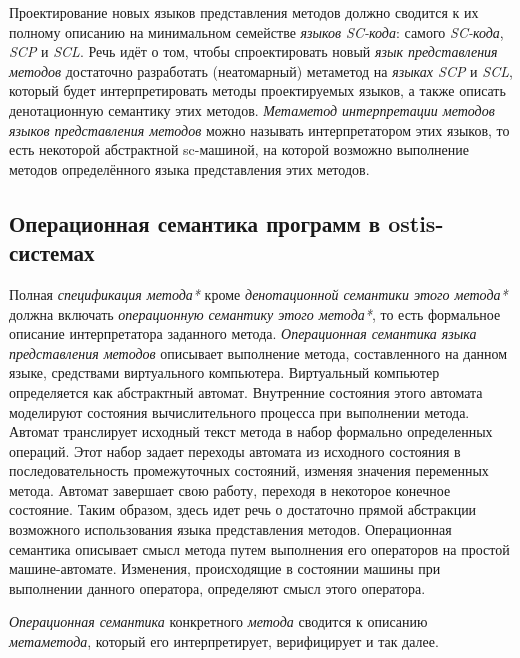 \begin{textitemize}
    \item Проектирование новых языков представления методов должно сводится к их полному описанию на минимальном семействе \textit{языков SC-кода}: самого \textit{SC-кода}, \textit{SCP} и \textit{SCL}. Речь идёт о том, чтобы спроектировать новый \textit{язык представления методов} достаточно разработать (неатомарный) метаметод на \textit{языках SCP} и \textit{SCL}, который будет интерпретировать методы проектируемых языков, а также описать денотационную семантику этих методов. \textit{Метаметод интерпретации методов языков представления методов} можно называть интерпретатором этих языков, то есть некоторой абстрактной sc-машиной, на которой возможно выполнение методов определённого языка представления этих методов.
\end{textitemize}

\subsection{Операционная семантика программ в ostis-системах}
\label{sec_programs_method_op_semantic}

Полная \textit{спецификация метода*} кроме \textit{денотационной семантики этого метода*} должна включать \textit{операционную семантику этого метода*}, то есть формальное описание интерпретатора заданного метода. \textit{Операционная семантика языка представления методов} описывает выполнение метода, составленного на данном языке, средствами виртуального компьютера. Виртуальный компьютер определяется как абстрактный автомат. Внутренние состояния этого автомата моделируют состояния вычислительного процесса при выполнении метода. Автомат транслирует исходный текст метода в набор формально определенных операций. Этот набор задает переходы автомата из исходного состояния в последовательность промежуточных состояний, изменяя значения переменных метода. Автомат завершает свою работу, переходя в некоторое конечное состояние. Таким образом, здесь идет речь о достаточно прямой абстракции возможного использования языка представления методов. Операционная семантика описывает смысл метода путем выполнения его операторов на простой машине-автомате. Изменения, происходящие в состоянии машины при выполнении данного оператора, определяют смысл этого оператора.

\textit{Операционная семантика} конкретного \textit{метода} сводится к описанию \textit{метаметода}, который его интерпретирует, верифицирует и так далее.

\begin{SCn}
\end{SCn}

